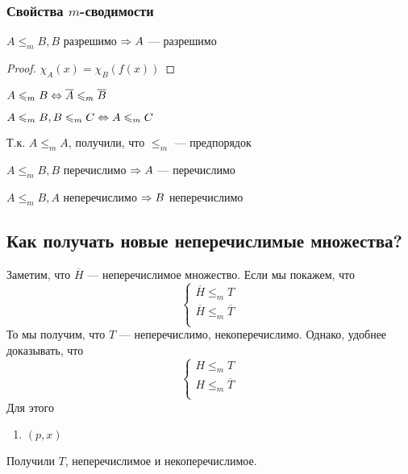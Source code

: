 \subsubsection{Свойства \(m\)-сводимости}
\begin{proposition}
    \(A \le_m B, B\) разрешимо \(\Rightarrow A\) --- разрешимо
\end{proposition}
\begin{proof}
    \(\chi_A(x) = \chi_B(f(x))\)
\end{proof}
\begin{proposition}
    \(A \leqslant_m B \Leftrightarrow \overline{A} \leqslant_m \overline{B}\)
\end{proposition}
\begin{proposition}
    \(A \leqslant_m B, B \leqslant_m C \Leftrightarrow A \leqslant_m C\)
\end{proposition}

\begin{note}
    Т.к. \(A \le_m A\), получили, что \(\le_m\) --- предпорядок
\end{note}

\begin{proposition}
    \(A \le_m B, B\) перечислимо \(\Rightarrow A\) --- перечислимо
\end{proposition}

\begin{corollary}
    \(A \le_m B, A\) неперечислимо \(\Rightarrow B\) неперечислимо
\end{corollary}

\subsection{Как получать новые неперечислимые множества?}
Заметим, что \(\overline{H}\) --- неперечислимое множество. Если мы покажем, что 
\[\left\{\begin{array}{l}
    \overline{H} \le_m T \\
    \overline{H} \le_m \overline{T} \\
\end{array}\right.\]
То мы получим, что \(T\) --- неперечислимо, некоперечислимо. Однако, удобнее доказывать, что 
\[\left\{\begin{array}{l}
    H \le_m T \\
    H \le_m \overline{T} \\
\end{array}\right.\]
Для этого
\begin{enumerate}
    \item \((p, x)\)
\end{enumerate}
Получили \(T\), неперечислимое и некоперечислимое.

